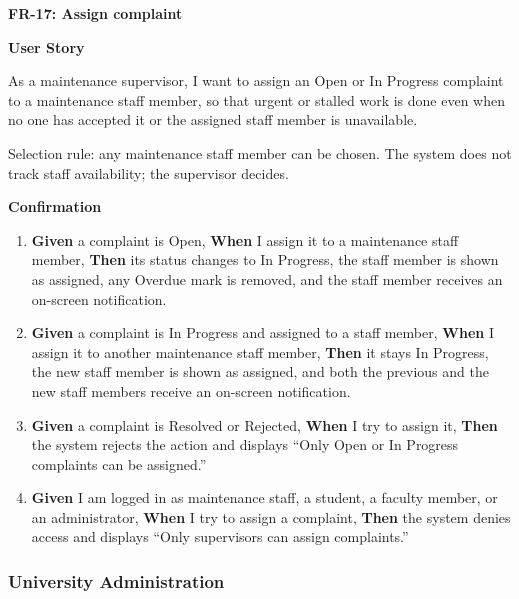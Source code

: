\noindent\textbf{FR-17: Assign complaint}\par\nopagebreak[4]\smallskip
\noindent\textbf{User Story}\par\nopagebreak[4]
\noindent As a maintenance supervisor, I want to assign an Open or In Progress complaint to a maintenance staff member, so that urgent or stalled work is done even when no one has accepted it or the assigned staff member is unavailable.\par\smallskip
\noindent Selection rule: any maintenance staff member can be chosen. The system does not track staff availability; the supervisor decides.\par\smallskip
{\makeatletter
{}
\makeatother
\noindent\textbf{Confirmation}\par\nopagebreak[4]\vspace{-6pt}\nopagebreak[4]
\begin{enumerate}\setlength{\itemsep}{2pt}\setlength{\parsep}{0pt}\setlength{\topsep}{2pt}\setlength{\partopsep}{0pt}
  \item \textbf{Given} a complaint is Open, \textbf{When} I assign it to a maintenance staff member, \textbf{Then} its status changes to In Progress, the staff member is shown as assigned, any Overdue mark is removed, and the staff member receives an on-screen notification.
  \item \textbf{Given} a complaint is In Progress and assigned to a staff member, \textbf{When} I assign it to another maintenance staff member, \textbf{Then} it stays In Progress, the new staff member is shown as assigned, and both the previous and the new staff members receive an on-screen notification.
  \item \textbf{Given} a complaint is Resolved or Rejected, \textbf{When} I try to assign it, \textbf{Then} the system rejects the action and displays ``Only Open or In Progress complaints can be assigned.''
  \item \textbf{Given} I am logged in as maintenance staff, a student, a faculty member, or an administrator, \textbf{When} I try to assign a complaint, \textbf{Then} the system denies access and displays ``Only supervisors can assign complaints.''
\end{enumerate}}
\medskip
 
\subsubsection*{University Administration}

